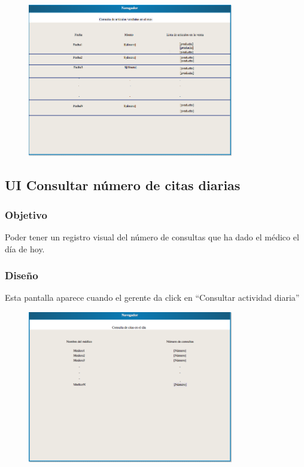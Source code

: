 \begin{figure}[htbp!]
        \centering
            \includegraphics[width=0.8\textwidth]{images/consultaVentasMes}
            
            
    \end{figure}
    

\subsection{UI Consultar número de citas diarias}
\subsubsection{Objetivo}
Poder tener un registro visual del número de consultas que ha dado el médico el día de hoy.
\subsubsection{Diseño}
   Esta pantalla aparece cuando el gerente da click en ``Consultar actividad diaria'' 


\begin{figure}[htbp!]
        \centering
            \includegraphics[width=0.8\textwidth]{images/consultaCitasDia}
            
            
    \end{figure}
 
